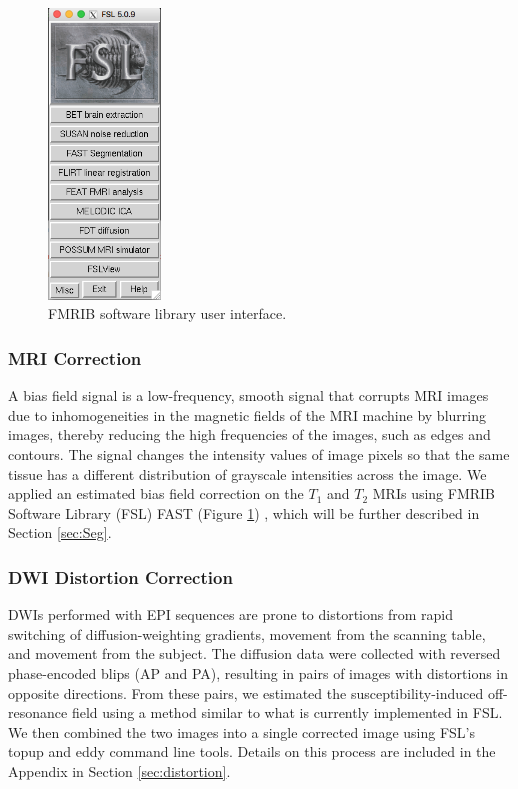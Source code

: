 \begin{figure}
    \centering
    \vspace{-80pt}
    \includegraphics[width=3cm]{Figures/FSL}
    \caption{FMRIB software library user interface.}
    \label{fig:fsl}
\end{figure}

\subsubsection{MRI Correction}

A bias field signal is a low-frequency, smooth signal that corrupts MRI images due to inhomogeneities in the magnetic fields of the MRI machine by blurring images, thereby reducing the high frequencies of the images, such as edges and contours. The signal changes the intensity values of image pixels so that the same tissue has a different distribution of grayscale intensities across the image. \cite{ref:bias} We applied an estimated bias field correction on the $T_1$ and $T_2$ MRIs using FMRIB Software Library (FSL) FAST (Figure \ref{fig:fsl}) \cite{ref:fslfast}, which will be further described in Section \ref{sec:Seg}.

\subsubsection{DWI Distortion Correction}

DWIs performed with EPI sequences are prone to distortions from rapid switching of diffusion-weighting gradients, movement from the scanning table, and movement from the subject. The diffusion data were collected with reversed phase-encoded blips (AP and PA), resulting in pairs of images with distortions in opposite directions. From these pairs, we estimated the susceptibility-induced off-resonance field using a method \cite{ref:fsltopup1} similar to what is currently implemented in FSL.\cite{ref:fsltopup2} We then combined the two images into a single corrected image using FSL's topup and eddy command line tools. Details on this process are included in the Appendix in Section \ref{sec:distortion}.

